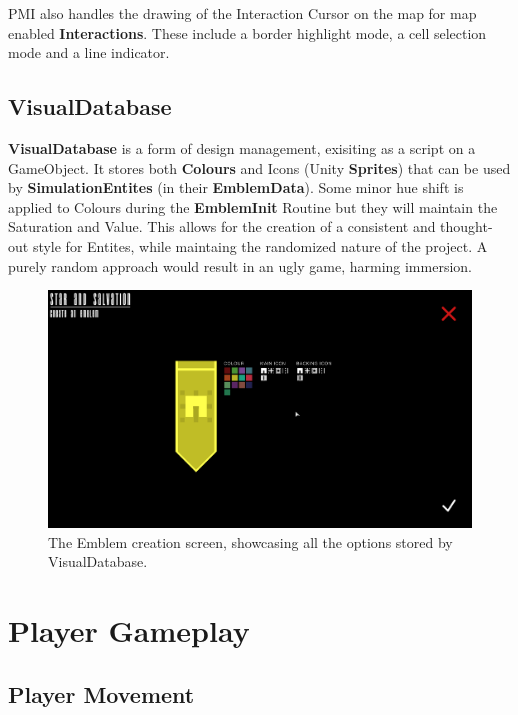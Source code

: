 \documentclass{report}
\begin{document}
PMI also handles the drawing of the Interaction Cursor on the map for map enabled \textbf{Interactions}. These include a border highlight mode, a cell selection mode and a line indicator.

\subsection{VisualDatabase}

\textbf{VisualDatabase} is a form of design management, exisiting as a script on a GameObject. It stores both \textbf{Colours} and Icons (Unity \textbf{Sprites}) that can be used by \textbf{SimulationEntites} (in their \textbf{EmblemData}). Some minor hue shift is applied to Colours during the \textbf{EmblemInit} Routine but they will maintain the Saturation and Value. This allows for the creation of a consistent and thought-out style for Entites, while maintaing the randomized nature of the project. A purely random approach would result in an ugly game, harming immersion.

\begin{figure}[H]
	\centering
    \includegraphics[width=.9\textwidth]{visualDatabase.png}
    \caption{The Emblem creation screen, showcasing all the options stored by VisualDatabase.}
\end{figure}

\section{Player Gameplay}

\subsection{Player Movement}
\end{document}
